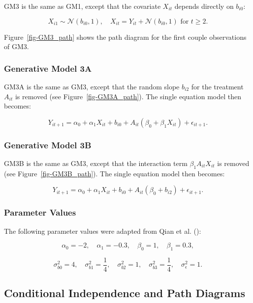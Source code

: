 \documentclass[
  12pt,
  a4paper,
]{article}
\begin{document}
GM3 is the same as GM1, except that the covariate \(X_{it}\) depends
directly on \(b_{i0}\):

\[
X_{i1} \sim \mathcal{N}(b_{i0}, 1), \quad X_{it} = Y_{it} + \mathcal{N}(b_{i0}, 1) \text{ for } t \geq 2.
\]

Figure~\ref{fig-GM3_path} shows the path diagram for the first couple
observations of GM3.

\subsubsection{Generative Model 3A}\label{generative-model-3a}

GM3A is the same as GM3, except that the random slope \(b_{i2}\) for the
treatment \(A_{it}\) is removed (see Figure~\ref{fig-GM3A_path}). The
single equation model then becomes:

\[
Y_{it+1} = \alpha_0 + \alpha_1 X_{it} + b_{i0} + A_{it} (\beta_0 + \beta_1 X_{it}) + \epsilon_{it+1}.
\]

\subsubsection{Generative Model 3B}\label{generative-model-3b}

GM3B is the same as GM3, except that the interaction term
\(\beta_1 A_{it} X_{it}\) is removed (see Figure~\ref{fig-GM3B_path}).
The single equation model then becomes:

\[
Y_{it+1} = \alpha_0 + \alpha_1 X_{it} + b_{i0} + A_{it} (\beta_0 + b_{i2}) + \epsilon_{it+1}.
\]

\subsubsection{Parameter Values}\label{parameter-values}

The following parameter values were adapted from Qian et al.
():

\[
\alpha_0 = -2, \quad \alpha_1 = -0.3, \quad \beta_0 = 1, \quad \beta_1 = 0.3,
\]

\[
\sigma_{b0}^2 = 4, \quad \sigma_{b1}^2 = \frac{1}{4}, \quad \sigma_{b2}^2 = 1, \quad \sigma_{b3}^2 = \frac{1}{4}, \quad \sigma_\epsilon^2 = 1.
\]

\subsection{Conditional Independence and Path
Diagrams}\label{conditional-independence-and-path-diagrams}
\end{document}
